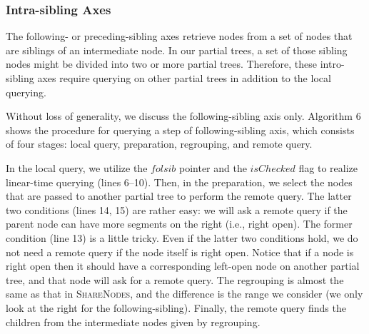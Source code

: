 

\subsubsection{Intra-sibling Axes}

The following- or preceding-sibling axes retrieve nodes from a set of nodes
that are siblings of an intermediate node.  In our partial trees, a set of those sibling nodes
might be divided into two or more partial trees. 
Therefore, these intro-sibling axes require querying on other partial trees in addition to the local querying.

Without loss of generality, we discuss the following-sibling axis only.
Algorithm 6 shows the procedure for querying a step of following-sibling axis,
which consists of four stages: local query, preparation, regrouping, and remote query.

In the local query, we utilize the $\mathit{folsib}$ pointer and the $\mathit{isChecked}$ flag
to realize linear-time querying (lines 6--10). 
Then, in the preparation, we select the nodes that are passed to another partial tree
to perform the remote query.  The latter two conditions (lines 14, 15) are rather easy:
we will ask a remote query if the parent node can have more segments on the right (i.e., right open).
The former condition (line 13) is a little tricky.  Even if the latter two conditions hold,
we do not need a remote query if the node itself is right open.  Notice that if a node is right open
then it should have a corresponding left-open node on another partial tree, and 
that node will ask for a remote query.  The regrouping is almost the same as that in \textsc{ShareNodes},
and the difference is the range we consider (we only look at the right for the following-sibling).
Finally, the remote query finds the children from the intermediate nodes given by regrouping.

